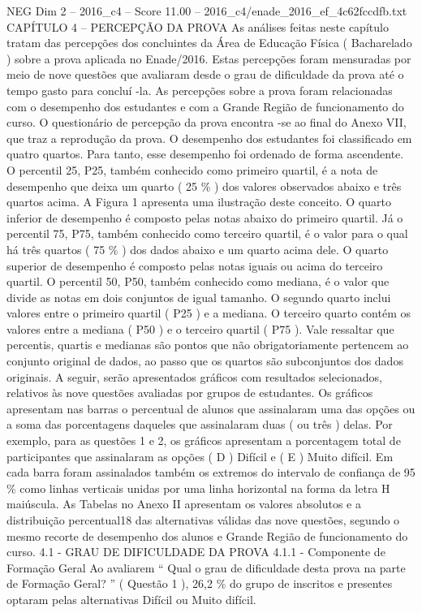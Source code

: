 \begin{textsample}{NEG Dim 2 – 2016\_c4 – Score 11.00 – 2016\_c4/enade\_2016\_ef\_4c62fccdfb.txt}  \label{ex:f2_neg_363}
CAPÍTULO 4 – PERCEPÇÃO DA PROVA As análises feitas neste capítulo tratam das percepções dos concluintes da Área de Educação Física ( Bacharelado ) sobre a prova aplicada no Enade/2016.
Estas percepções foram mensuradas por meio de nove questões que avaliaram desde o grau de dificuldade da prova até o tempo gasto para concluí -la.
As percepções sobre a prova foram relacionadas com o desempenho dos estudantes e com a Grande Região de funcionamento do curso.
O questionário de percepção da prova encontra -se ao final do Anexo VII, que traz a reprodução da prova.
O desempenho dos estudantes foi classificado em quatro quartos.
Para tanto, esse desempenho foi ordenado de forma ascendente.
O percentil 25, P25, também conhecido como primeiro quartil, é a nota de desempenho que deixa um quarto ( 25 \% ) dos valores observados abaixo e três quartos acima.
A Figura 1 apresenta uma ilustração deste conceito.
O quarto inferior de desempenho é composto pelas notas abaixo do primeiro quartil.
Já o percentil 75, P75, também conhecido como terceiro quartil, é o valor para o qual há três quartos ( 75 \% ) dos dados abaixo e um quarto acima dele.
O quarto superior de desempenho é composto pelas notas iguais ou acima do terceiro quartil.
O percentil 50, P50, também conhecido como mediana, é o valor que divide as notas em dois conjuntos de igual tamanho.
O segundo quarto inclui valores entre o primeiro quartil ( P25 ) e a mediana.
O terceiro quarto contém os valores entre a mediana ( P50 ) e o terceiro quartil ( P75 ).
Vale ressaltar que percentis, quartis e medianas são pontos que não obrigatoriamente pertencem ao conjunto original de dados, ao passo que os quartos são subconjuntos dos dados originais.
A seguir, serão apresentados gráficos com resultados selecionados, relativos às nove questões avaliadas por grupos de estudantes.
Os gráficos apresentam nas barras o percentual de alunos que assinalaram uma das opções ou a soma das porcentagens daqueles que assinalaram duas ( ou três ) delas.
Por exemplo, para as questões 1 e 2, os gráficos apresentam a porcentagem total de participantes que assinalaram as opções ( D ) Difícil e ( E ) Muito difícil.
Em cada barra foram assinalados também os extremos do intervalo de confiança de 95 \% como linhas verticais unidas por uma linha horizontal na forma da letra H maiúscula.
As Tabelas no Anexo II apresentam os valores absolutos e a distribuição percentual18 das alternativas válidas das nove questões, segundo o mesmo recorte de desempenho dos alunos e Grande Região de funcionamento do curso. 4.1 - GRAU DE DIFICULDADE DA PROVA 4.1.1 - Componente de Formação Geral Ao avaliarem “ Qual o grau de dificuldade desta prova na parte de Formação Geral? ” ( Questão 1 ), 26,2 \% do grupo de inscritos e presentes optaram pelas alternativas Difícil ou Muito difícil.

\end{textsample}
